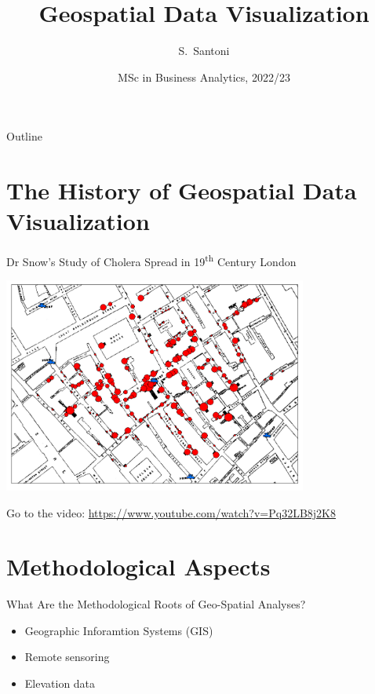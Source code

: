 \documentclass[notes, aspectratio=1610]{beamer}
\title{Geospatial Data Visualization}
\author{S.~Santoni\inst{1}\inst{2}}
\institute{
	\inst{1}%
	Bayes Business School
	\and
	\inst{2}%
	Soundcloud
	}
\date{MSc in Business Analytics, 2022/23}
\begin{document}
\begin{frame}
	\titlepage
\end{frame}

\begin{frame}{Outline}
	\tableofcontents
\end{frame}

\section{The History of Geospatial Data Visualization}

\begin{frame}{Dr Snow's Study of Cholera Spread in 19\textsuperscript{th} 
	Century London}{}
	
	\centering 

	\includegraphics[width=0.75\textwidth]{images/SnowMap_Points.png}

	Go to the video: \url{https://www.youtube.com/watch?v=Pq32LB8j2K8}
\end{frame}

\section{Methodological Aspects}

\begin{frame}{What Are the Methodological Roots of Geo-Spatial Analyses?}
	\begin{itemize}
		\item 
		Geographic Inforamtion Systems (GIS)
		\item 
		Remote sensoring
		\item 
		Elevation data
	\end{itemize}
\end{frame}
\end{document}

